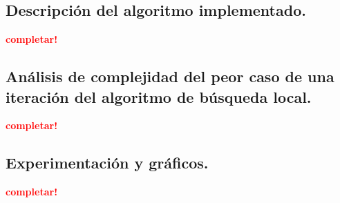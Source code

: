 \subsection{Descripción del algoritmo implementado.}
\vspace*{0.3cm}
\textcolor{red}{\textbf{completar!}}



\newpage
\subsection{Análisis de complejidad del peor caso de una iteración del
            algoritmo de búsqueda local.}
\vspace*{0.3cm}
\textcolor{red}{\textbf{completar!}}



\newpage
\subsection{Experimentación y gráficos.}
\vspace*{0.3cm}
\textcolor{red}{\textbf{completar!}}
